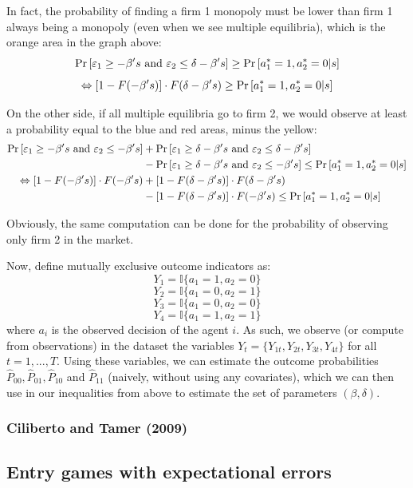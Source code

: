 In fact,  the probability of finding a firm 1 monopoly must be lower than firm 1 always being a monopoly (even when we see multiple equilibria), which is the orange area in the graph above:
$$ \operatorname{Pr}\left[ \varepsilon_1 \geq - \beta's \text{ and } \varepsilon_2 \leq \delta - \beta's\right] \geq \operatorname{Pr}\left[a_1^* = 1, a_2^* = 0 | s\right] $$
$$ \Leftrightarrow [1 - F( - \beta's) ] \cdot  F( \delta - \beta's) \geq \operatorname{Pr}\left[a_1^* = 1, a_2^* = 0 | s\right] $$

On the other side, if all multiple equilibria go to firm 2, we would observe at least a probability equal to the blue and red areas, minus the yellow: \begin{align*}
\operatorname{Pr}\left[ \varepsilon_1 \geq - \beta's \text{ and } \varepsilon_2 \leq - \beta's\right]  & + \operatorname{Pr}\left[ \varepsilon_1 \geq \delta - \beta's \text{ and } \varepsilon_2 \leq \delta - \beta's\right] \\  & - \operatorname{Pr}\left[ \varepsilon_1 \geq \delta - \beta's \text{ and } \varepsilon_2 \leq - \beta's\right] \leq \operatorname{Pr}\left[a_1^* = 1, a_2^* = 0 | s\right]\\
\Leftrightarrow [1 - F( - \beta's)]\cdot F( - \beta's)  & + [1 - F( \delta - \beta's)]\cdot F(\delta - \beta's) \\  & - [1 - F(\delta - \beta's)]\cdot  F( - \beta's) \leq \operatorname{Pr}\left[a_1^* = 1, a_2^* = 0 | s\right]
\end{align*}

Obviously, the same computation can be done for the probability of observing only firm 2 in the market.

Now, define mutually exclusive outcome indicators as: $$ Y_1 = \mathbb{I}\{a_1 = 1, a_2 = 0\} $$ $$ Y_2 = \mathbb{I}\{a_1 = 0, a_2 = 1\} $$ $$ Y_3 = \mathbb{I}\{a_1 = 0, a_2 = 0\} $$ $$ Y_4 = \mathbb{I}\{a_1 = 1, a_2 = 1\} $$
where $a_i$ is the observed decision of the agent $i$. As such, we observe (or compute from observations) in the dataset the variables $Y_t = \{ Y_{1t}, Y_{2t}, Y_{3t}, Y_{4t} \} $ for all $t = 1, ..., T$. Using these variables, we can estimate the outcome probabilities $\hat P_{00}, \hat P_{01}, \hat P_{10}$ and $\hat P_{11}$ (naively, without using any covariates), which we can then use in our inequalities from above to estimate the set of parameters $(\beta, \delta)$.

\subsubsection{Ciliberto and Tamer (2009)}



\subsection{Entry games with expectational errors}

